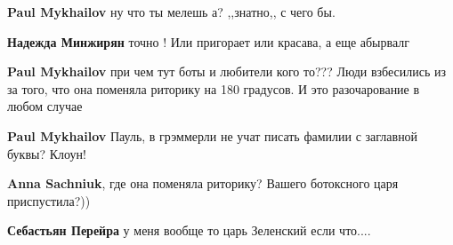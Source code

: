 \begin{itemize}
\begin{itemize}
 
\textbf{Paul Mykhailov} ну что ты мелешь а? ,,знатно,, с чего бы.🤑

 
\textbf{Надежда Минжирян} точно ! Или пригорает или красава, а еще абырвалг

 
\textbf{Paul Mykhailov} при чем тут боты и любители кого то??? Люди взбесились из за того, что она поменяла риторику на 180 градусов. И это разочарование в любом случае

 
\textbf{Paul Mykhailov} Пауль, в грэммерли не учат писать фамилии с заглавной буквы? Клоун!

 
\textbf{Anna Sachniuk}, где она поменяла риторику? Вашего ботоксного царя приспустила?))

 
\textbf{Себастьян Перейра} у меня вообще то царь Зеленский если что....

 

\end{itemize}
\end{itemize}
